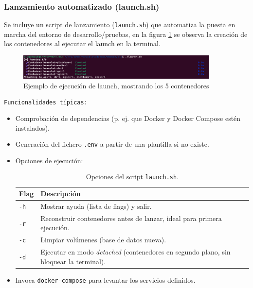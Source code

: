 \documentclass[12pt, a4paper]{article}
\begin{document}
\subsubsection{Lanzamiento automatizado (launch.sh)}
Se incluye un script de lanzamiento (\texttt{launch.sh}) que automatiza la puesta en marcha del entorno de desarrollo/pruebas, en la figura \ref{fig:launch} se observa la creación de los contenedores al ejecutar el launch en la terminal. 



\begin{figure}[htbp]
	\centering
	\includegraphics[width=0.9\textwidth]{images/ejemplo_launch.png}
	\caption[launch]{Ejemplo de ejecución de launch, mostrando los 5 contenedores}
	\label{fig:launch}
\end{figure}

\texttt{Funcionalidades típicas:}
\begin{itemize}
	\item Comprobación de dependencias (p. ej. que Docker y Docker Compose estén instalados).
	\item Generación del fichero \texttt{.env} a partir de una plantilla si no existe.
	\item Opciones de ejecución:
	
	\begin{table}[ht]
		\centering
		\begin{tabular}{@{}ll@{}}
			\toprule
			\textbf{Flag} & \textbf{Descripción} \\
			\midrule
			\texttt{-h} & Mostrar ayuda (lista de flags) y salir. \\
			\texttt{-r} & Reconstruir contenedores antes de lanzar, ideal para primera ejecución. \\
			\texttt{-c} & Limpiar volúmenes (base de datos nueva). \\
			\texttt{-d} & Ejecutar en modo \emph{detached} (contenedores en segundo plano, sin bloquear la terminal). \\
			\bottomrule
		\end{tabular}
		\caption{Opciones del script \texttt{launch.sh}.}
		\label{tab:launch_flags}
	\end{table}
	
	\item Invoca \texttt{docker-compose} para levantar los servicios definidos.
\end{itemize}
\end{document}
